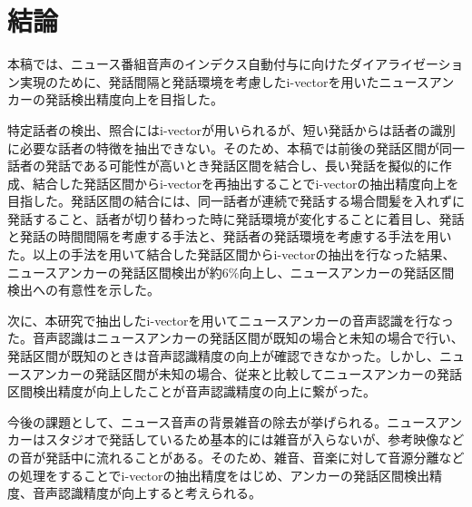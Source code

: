 \chapter{結論}
本稿では、ニュース番組音声のインデクス自動付与に向けたダイアライゼーション実現のために、発話間隔と発話環境を考慮したi-vectorを用いたニュースアンカーの発話検出精度向上を目指した。\par
特定話者の検出、照合にはi-vectorが用いられるが、短い発話からは話者の識別に必要な話者の特徴を抽出できない。そのため、本稿では前後の発話区間が同一話者の発話である可能性が高いとき発話区間を結合し、長い発話を擬似的に作成、結合した発話区間からi-vectorを再抽出することでi-vectorの抽出精度向上を目指した。発話区間の結合には、同一話者が連続で発話する場合間髪を入れずに発話すること、話者が切り替わった時に発話環境が変化することに着目し、発話と発話の時間間隔を考慮する手法と、発話者の発話環境を考慮する手法を用いた。以上の手法を用いて結合した発話区間からi-vectorの抽出を行なった結果、ニュースアンカーの発話区間検出が約6\%向上し、ニュースアンカーの発話区間検出への有意性を示した。\par
次に、本研究で抽出したi-vectorを用いてニュースアンカーの音声認識を行なった。音声認識はニュースアンカーの発話区間が既知の場合と未知の場合で行い、発話区間が既知のときは音声認識精度の向上が確認できなかった。しかし、ニュースアンカーの発話区間が未知の場合、従来と比較してニュースアンカーの発話区間検出精度が向上したことが音声認識精度の向上に繋がった。\par
今後の課題として、ニュース音声の背景雑音の除去が挙げられる。ニュースアンカーはスタジオで発話しているため基本的には雑音が入らないが、参考映像などの音が発話中に流れることがある。そのため、雑音、音楽に対して音源分離などの処理をすることでi-vectorの抽出精度をはじめ、アンカーの発話区間検出精度、音声認識精度が向上すると考えられる。